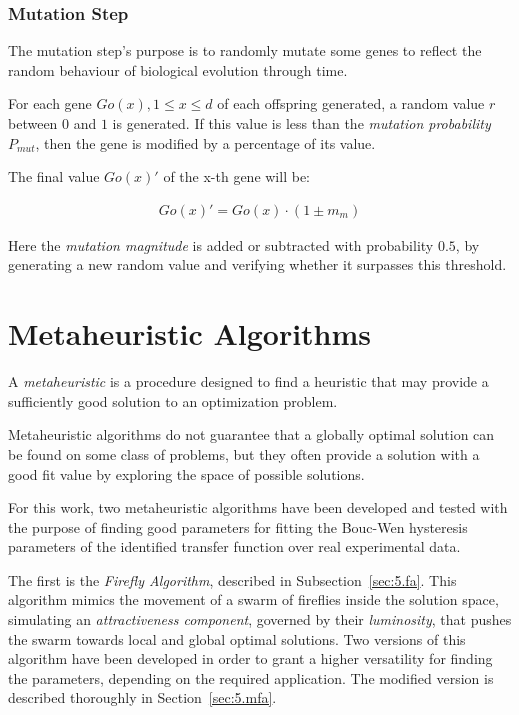 \subsubsection{Mutation Step}

The mutation step's purpose is to randomly mutate some genes to reflect
the random behaviour of biological evolution through time. 

For each gene $Go(x), 1\le x \le d$ of each offspring generated,
a random value $r$ between $0$ and $1$ is generated. If this value
is less than the \textit{mutation probability} $P_{mut}$, then
the gene is modified by a percentage of its value.

The final value $Go(x)'$ of the x-th gene will be:

\begin{align*}
Go(x)' = Go(x)\cdot \left(1 \pm m_m\right)
\end{align*}

Here the \textit{mutation magnitude} is added or subtracted
with probability $0.5$, by generating a new random value and
verifying whether it surpasses this threshold.

\section{Metaheuristic Algorithms}
\label{sec:5.opt}

A \textit{metaheuristic} is a procedure designed to find a heuristic
that may provide a sufficiently good solution to an optimization problem.

Metaheuristic algorithms do not guarantee that a globally optimal solution
can be found on some class of problems, but they often provide a solution
with a good fit value by exploring the space of possible solutions.

For this work, two metaheuristic algorithms have been developed and tested
with the purpose of finding good parameters for fitting the Bouc-Wen hysteresis
parameters of the identified transfer function over real experimental data.

The first is the \textit{Firefly Algorithm}, described in Subsection~\ref{sec:5.fa}.
This algorithm mimics the movement of a swarm of fireflies inside the solution space,
simulating an \textit{attractiveness component}, governed by their \textit{luminosity},
that pushes the swarm towards local and global optimal solutions.
Two versions of this algorithm have been developed in order to grant a higher
versatility for finding the parameters, depending on the required application.
The modified version is described thoroughly in Section~\ref{sec:5.mfa}.

